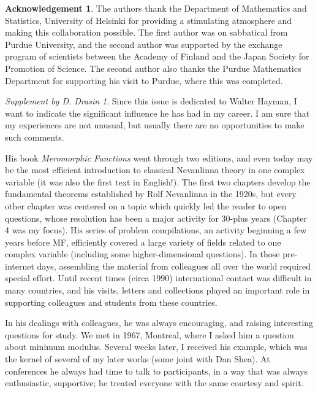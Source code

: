 \documentclass[a4paper,12pt]{amsart}
\theoremstyle{plain}
\theoremstyle{definition}
\newtheorem*{ac}{Acknowledgement}
\theoremstyle{remark}
\newtheorem*{supplement}{Supplement by D. Drasin}
\numberwithin{equation}{section}
\begin{document}
\begin{ac}
 The authors thank the Department of Mathematics and Statistics,
 University of Helsinki for providing a stimulating atmosphere
 and making this collaboration possible. The first author
 was on sabbatical from Purdue University, and
 the second author was supported by the exchange program of scientists
 between the Academy of Finland and the Japan Society for Promotion of Science.
 The second author also thanks the Purdue Mathematics Department for
 supporting his visit to Purdue, where this was completed.
\end{ac}

\begin{supplement}
 Since this issue is dedicated to Walter Hayman,
 I want to indicate the significant influence he has had in my career. 
 I am sure that my experiences are not unusual, but usually there are no opportunities
 to make such comments.

 His book {\itshape Meromorphic Functions} went through two editions, and even today
 may be the most efficient introduction to classical Nevanlinna theory in one
 complex variable (it was also the first text in English!).  The first two chapters develop the fundamental
 theorems established by Rolf Nevanlinna in the 1920s, but every other chapter
 was centered on a topic which quickly led the reader to open questions, whose
 resolution has been a major activity for 30-plus years (Chapter 4 was
 my focus).   His series of  problem compilations,
 an activity beginning a few years before MF, efficiently covered a large
 variety of fields related to one complex variable (including some
 higher-dimensional questions).  In those pre-internet days, assembling the
 material from colleagues all over the world required special effort.
 Until recent times (circa 1990) international contact was difficult in
 many countries, and his visits, letters and collections played an important
 role in supporting colleagues and students from these countries.

 In his dealings with colleagues, he was always encouraging, and raising
 interesting questions for study.
 We met in 1967, Montreal, where I asked him a question about minimum
 modulus. Several weeks later, I received his example, which was the
 kernel of several of my later works (some joint with Dan Shea).
 At conferences he always had time to talk to participants, in a way
 that was always enthusiastic, supportive; he treated everyone with
 the same courtesy and spirit.
\end{supplement}
\end{document}
